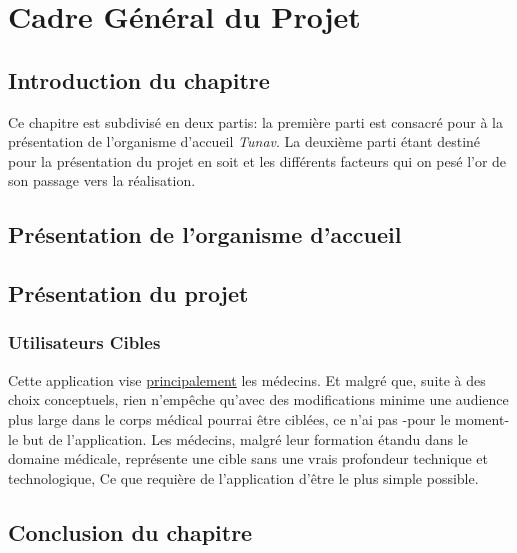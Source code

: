 
\chapter{Cadre Général du Projet}
\section{Introduction du chapitre}
Ce chapitre est subdivisé en deux partis: la première parti est consacré pour à la présentation de l'organisme d’accueil \textit{Tunav}. La deuxième parti étant destiné pour la présentation du projet en soit et les différents facteurs qui on pesé l'or de son passage vers la réalisation.
\section{Présentation de l'organisme d'accueil}
\section{Présentation du projet}

\subsection{Utilisateurs Cibles}
Cette application vise \underline{principalement} les médecins. Et malgré que, suite à des choix conceptuels, rien n'empêche qu'avec des modifications minime une audience plus large dans le corps médical pourrai être ciblées, ce n'ai pas -pour le moment- le but de l'application.
Les médecins, malgré leur formation étandu dans le domaine médicale, représente une cible sans une vrais profondeur technique et technologique, Ce que requière de l'application d’être le plus simple possible. 
\section{Conclusion du chapitre}